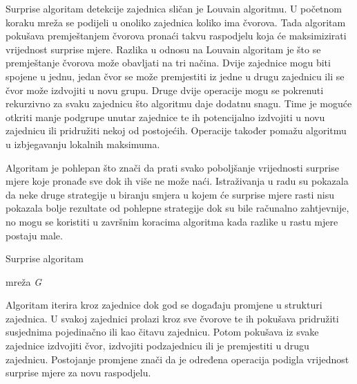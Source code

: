 Surprise algoritam detekcije zajednica sličan je Louvain algoritmu. U početnom koraku mreža se podijeli u onoliko zajednica koliko ima čvorova. Tada algoritam pokušava premještanjem čvorova pronaći takvu raspodjelu koja će maksimizirati vrijednost surprise mjere. Razlika u odnosu na Louvain algoritam je što se premještanje čvorova može obavljati na tri načina. Dvije zajednice mogu biti spojene u jednu, jedan čvor se može premjestiti iz jedne u drugu zajednicu ili se čvor može izdvojiti u novu grupu. Druge dvije operacije mogu se pokrenuti rekurzivno za svaku zajednicu što algoritmu daje dodatnu snagu. Time je moguće otkriti manje podgrupe unutar zajednice te ih potencijalno izdvojiti u novu zajednicu ili pridružiti nekoj od postojećih. Operacije također pomažu algoritmu u izbjegavanju lokalnih maksimuma.

Algoritam je pohlepan što znači da prati svako poboljšanje vrijednosti surprise mjere koje pronađe sve dok ih više ne može naći. Istraživanja u radu \cite{gamermann2022algorithm} su pokazala da neke druge strategije u biranju smjera u kojem će surprise mjere rasti nisu pokazala bolje rezultate od pohlepne strategije dok su bile računalno zahtjevnije, no mogu se koristiti u završnim koracima algoritma kada razlike u rastu mjere postaju male.


\begin{algorithm}
	\caption{Surprise algoritam}
	\begin{algorithmic}[1]
		\REQUIRE mreža \textit{G}
						\ENDIF
					\ENDFOR
				\ENDFOR 
				\ENDWHILE
				\ENDWHILE
					 \ENDFOR
				\ENDWHILE				
			\ENDFOR
		\ENDWHILE
	\end{algorithmic}
\end{algorithm}

Algoritam iterira kroz zajednice dok god se događaju promjene u strukturi zajednica. U svakoj zajednici prolazi kroz sve čvorove te ih pokušava pridružiti susjednima pojedinačno ili kao čitavu zajednicu. Potom pokušava iz svake zajednice izdvojiti čvor, izdvojiti podzajednicu ili je premjestiti u drugu zajednicu. Postojanje promjene znači da je određena operacija podigla vrijednost surprise mjere za novu raspodjelu.

